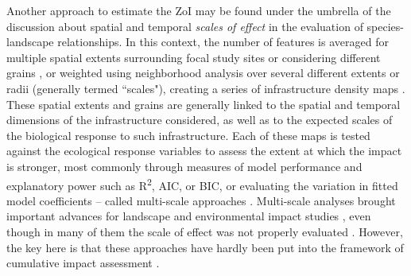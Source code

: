 \documentclass[titlepage]{article}
\begin{document}
Another approach to estimate the ZoI may be found under the umbrella of the discussion about spatial and temporal \textit{scales of effect} in the evaluation of species-landscape relationships. In this context, the number of features is averaged for multiple spatial extents surrounding focal study sites \citep{jackson_are_2015} or considering different grains \citep{laforge_process-focussed_2015}, or weighted using neighborhood analysis over several different extents or radii (generally termed ``scales"), creating a series of infrastructure density maps \citep{mcgarigal_multi-scale_2016}. These spatial extents and grains are generally linked to the spatial and temporal dimensions of the infrastructure considered, as well as to the expected scales of the biological response to such infrastructure. Each of these maps is tested against the ecological response variables to assess the extent at which the impact is stronger, most commonly through measures of model performance and explanatory power such as R\textsuperscript{2}, AIC, or BIC, or evaluating the variation in fitted model coefficients \citep{jackson_are_2015, huais_multifit_2018} -- called multi-scale approaches \citep[e.g.][]{zeller_multi-level_2017}.
Multi-scale analyses brought important advances for landscape and environmental impact studies \citep[e.g.][]{mcgarigal_multi-scale_2016}, even though in many of them the scale of effect was not properly evaluated \citep{jackson_are_2015}. However, the key here is that these approaches have hardly been put into the framework of cumulative impact assessment \citep[but see][]{polfus_identifying_2011}.
\end{document}
